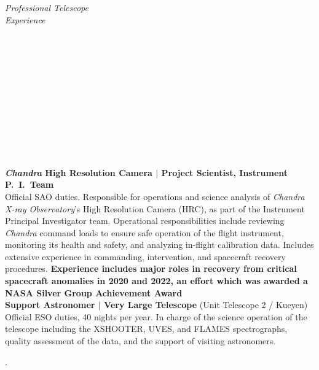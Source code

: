 \documentclass[11pt]{article}
\begin{document}
\hspace{2.5mm} \parbox{1.5in}{\textit{Professional Telescope \\ Experience \\\\\\\\\\\\\\\\\\\\\\\\}} \parbox{5.15in}{
\textbf{\textit{Chandra} High Resolution Camera $|$ Project Scientist, Instrument P.~I.~Team}\\
Official SAO duties. Responsible for operations and science analysis
of \textit{Chandra X-ray Observatory}'s High Resolution Camera (HRC), as part of the Instrument Principal Investigator team. Operational responsibilities include reviewing \textit{Chandra} command loads to ensure safe operation of the flight instrument, monitoring its health and safety, and analyzing in-flight calibration data. Includes extensive experience in commanding, intervention, and spacecraft recovery procedures.
\textbf{Experience includes major roles in recovery from critical spacecraft anomalies in 2020 and 2022, an effort which was awarded a NASA Silver Group Achievement Award}\\

\textbf{Support Astronomer $|$ Very Large Telescope} (Unit Telescope 2 / Kueyen)\\
Official ESO duties, 40 nights per year. In charge of the science operation of the telescope including the XSHOOTER, UVES, and FLAMES spectrographs, quality assessment of the data, and the support of visiting astronomers.}.






\end{document}
